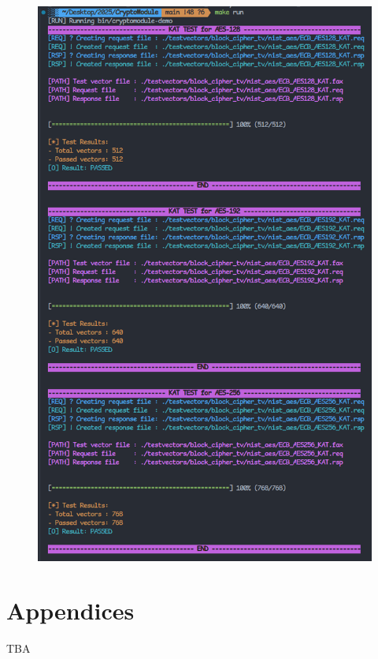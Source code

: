 \documentclass[11pt,a4paper]{report}
\theoremstyle{definitionstyle}
\begin{document}
\begin{figure}[h!]\centering
\includegraphics[scale=.65]{images/make_run}
\end{figure}

\newpage


\newpage
\appendix
\chapter*{Appendices}
TBA
\end{document}
